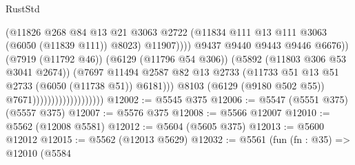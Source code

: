 \begin{lexlean}{RustStd}
\begin{coremodule}
                                                      (@11826
                                                        @268
                                                        @84
                                                        @13
                                                        @21
                                                        @3063
                                                        @2722
                                                        (@11834
                                                          @111
                                                          @13
                                                          @111
                                                          @3063
                                                          (@6050 (@11839 @111))
                                                          @8023)
                                                        @11907))))
                                                @9437
                                                @9440
                                                @9443
                                                @9446
                                                @6676))
                                            (@7919 (@11792 @46))
                                            (@6129 (@11796 @54 @306))
                                            (@5892 (@11803 @306 @53 @3041 @2674))
                                            (@7697
                                              @11494
                                              @2587
                                              @82
                                              @13
                                              @2733
                                              (@11733
                                                @51
                                                @13
                                                @51
                                                @2733
                                                (@6050 (@11738 @51))
                                                @6181)))
                                          @8103
                                          (@6129 (@9180 @502 @55))
                                          @7671)))))))))))))))))))
@12002 := @5545 @375
@12006 := @5547 (@5551 @375) (@5557 @375)
@12007 := @5576 @375
@12008 := @5566 @12007
@12010 := @5562 (@12008 @5581)
@12012 := @5604 (@5605 @375)
@12013 := @5600 @12012
@12015 := @5562 (@12013 @5629)
@12032 := @5561
    (fun (fn : @35) =>
    @12010
      (@5584

\end{coremodule}
\end{lexlean}
